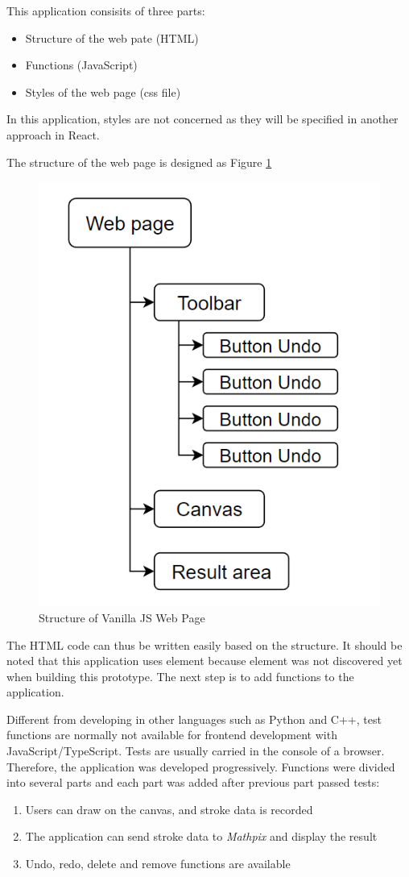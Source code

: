 \documentclass[12pt,twoside]{report}
\begin{document}
This application consisits of three parts: 
\begin{itemize}
    \item Structure of the web pate (HTML)
    \item Functions (JavaScript)
    \item Styles of the web page (css file)
\end{itemize}

In this application, styles are not concerned as they will be specified in another approach in React. 

The structure of the web page is designed as Figure \ref{fig:vanillajs-structure}

\begin{figure}
    \centering
    \includegraphics[width=0.5\linewidth, frame]{figures/vanillajs-structure.png}
    \caption{Structure of Vanilla JS Web Page}
    \label{fig:vanillajs-structure}
\end{figure}

The HTML code can thus be written easily based on the structure. It should be
noted that this application uses  element because 
element was not discovered yet when building this prototype. The next step is to
add functions to the application. 

Different from developing in other languages such as Python and C++, test
functions are normally not available for frontend development with
JavaScript/TypeScript. Tests are usually carried in the console of a browser. Therefore, the application was developed progressively. Functions were divided into several parts and each part was added after previous part passed tests:
\begin{enumerate}
    \item Users can draw on the canvas, and stroke data is recorded
    \item The application can send stroke data to \textit{Mathpix} and display the result
    \item Undo, redo, delete and remove functions are available
\end{enumerate}
\end{document}
